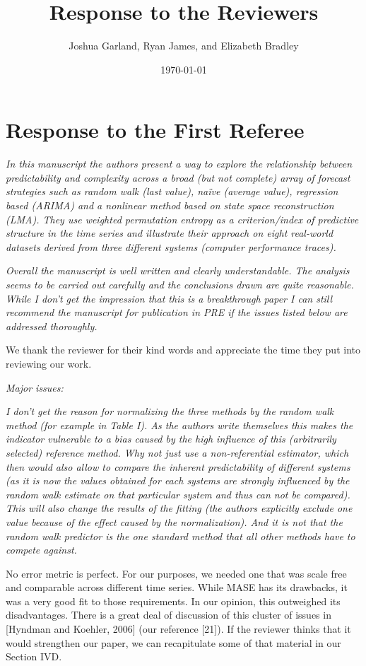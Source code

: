 \documentclass[12pt]{article}
\title{Response to the Reviewers}
\author{Joshua Garland, Ryan James, and Elizabeth Bradley}
\date{\today}
\newcommand{\alert}[1]{{\color{red}#1}}
\begin{document}
\maketitle

\section*{Response to the First Referee}

\emph{In this manuscript the authors present a way to explore the
  relationship between predictability and complexity across a broad
  (but not complete) array of forecast strategies such as random walk
  (last value), na\"ive (average value), regression based (ARIMA) and
  a nonlinear method based on state space reconstruction (LMA). They
  use weighted permutation entropy as a criterion/index of predictive
  structure in the time series and illustrate their approach on eight
  real-world datasets derived from three different systems (computer
  performance traces).}

\emph{Overall the manuscript is well written and clearly
  understandable. The analysis seems to be carried out carefully and
  the conclusions drawn are quite reasonable. While I don't get the
  impression that this is a breakthrough paper I can still recommend
  the manuscript for publication in PRE if the issues listed below are
  addressed thoroughly.}

We thank the reviewer for their kind words and appreciate the time
they put into reviewing our work.

\noindent\emph{Major issues:}

\emph{I don't get the reason for normalizing the three methods by the
  random walk method (for example in Table I). As the authors write
  themselves this makes the indicator vulnerable to a bias caused by
  the high influence of this (arbitrarily selected) reference
  method. Why not just use a non-referential estimator, which then
  would also allow to compare the inherent predictability of different
  systems (as it is now the values obtained for each systems are
  strongly influenced by the random walk estimate on that particular
  system and thus can not be compared). This will also change the
  results of the fitting (the authors explicitly exclude one value
  because of the effect caused by the normalization). And it is not
  that the random walk predictor is the one standard method that all
  other methods have to compete against.}

No error metric is perfect.  For our purposes, we needed one that was
scale free and comparable across different time series.  While MASE
has its drawbacks, it was a very good fit to those requirements.  In
our opinion, this outweighed its disadvantages.  There is a great deal
of discussion of this cluster of issues in [Hyndman and Koehler, 2006]
\alert{(our reference [21])}.  If the reviewer thinks that it would
strengthen our paper, we can recapitulate some of that material in our
Section IVD.
\end{document}
